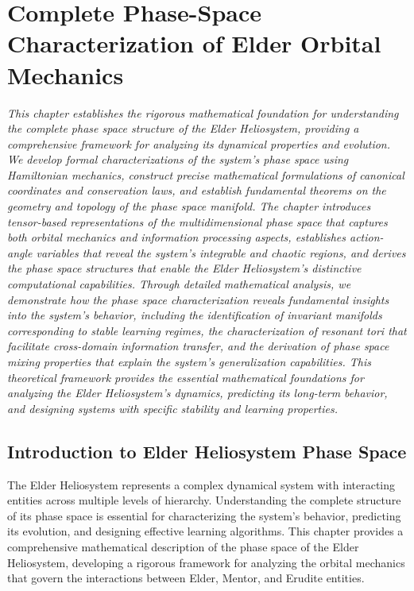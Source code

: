 \chapter{Complete Phase-Space Characterization of Elder Orbital Mechanics}

\textit{This chapter establishes the rigorous mathematical foundation for understanding the complete phase space structure of the Elder Heliosystem, providing a comprehensive framework for analyzing its dynamical properties and evolution. We develop formal characterizations of the system's phase space using Hamiltonian mechanics, construct precise mathematical formulations of canonical coordinates and conservation laws, and establish fundamental theorems on the geometry and topology of the phase space manifold. The chapter introduces tensor-based representations of the multidimensional phase space that captures both orbital mechanics and information processing aspects, establishes action-angle variables that reveal the system's integrable and chaotic regions, and derives the phase space structures that enable the Elder Heliosystem's distinctive computational capabilities. Through detailed mathematical analysis, we demonstrate how the phase space characterization reveals fundamental insights into the system's behavior, including the identification of invariant manifolds corresponding to stable learning regimes, the characterization of resonant tori that facilitate cross-domain information transfer, and the derivation of phase space mixing properties that explain the system's generalization capabilities. This theoretical framework provides the essential mathematical foundations for analyzing the Elder Heliosystem's dynamics, predicting its long-term behavior, and designing systems with specific stability and learning properties.}

\section{Introduction to Elder Heliosystem Phase Space}

The Elder Heliosystem represents a complex dynamical system with interacting entities across multiple levels of hierarchy. Understanding the complete structure of its phase space is essential for characterizing the system's behavior, predicting its evolution, and designing effective learning algorithms. This chapter provides a comprehensive mathematical description of the phase space of the Elder Heliosystem, developing a rigorous framework for analyzing the orbital mechanics that govern the interactions between Elder, Mentor, and Erudite entities.

